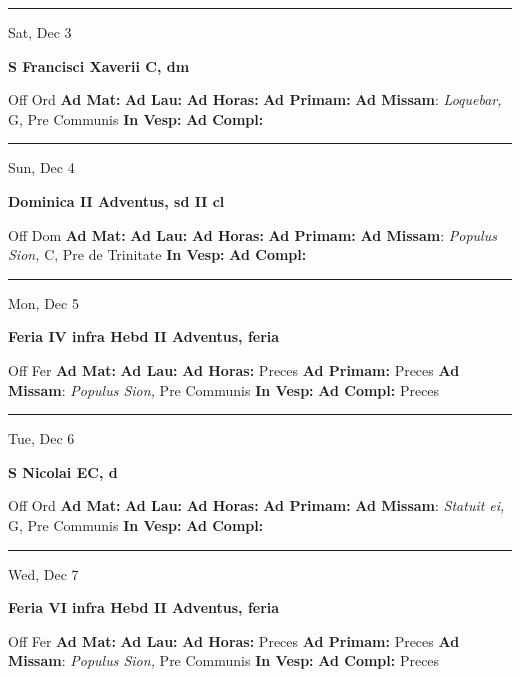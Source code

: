 \documentclass[letterpaper, 10pt]{article}
\begin{document}
\hrule
\begin{center}
Sat, Dec 3
\end{center}\textbf{ \large S Francisci Xaverii C, \textnormal{\normalsize dm}}
\begin{justify}
Off Ord
\textbf{Ad Mat: }
\textbf{Ad Lau: }
\textbf{Ad Horas: }
\textbf{Ad Primam: }
\textbf{Ad Missam}: \textit{Loquebar,} G, Pre Communis
\textbf{In Vesp: }
\textbf{Ad Compl: }\end{justify}



\hrule
\begin{center}
Sun, Dec 4
\end{center}\textbf{ \large Dominica II Adventus, \textnormal{\normalsize sd II cl}}
\begin{justify}
Off Dom
\textbf{Ad Mat: }
\textbf{Ad Lau: }
\textbf{Ad Horas: }
\textbf{Ad Primam: }
\textbf{Ad Missam}: \textit{Populus Sion,} C, Pre de Trinitate
\textbf{In Vesp: }
\textbf{Ad Compl: }\end{justify}



\hrule
\begin{center}
Mon, Dec 5
\end{center}\textbf{ \large Feria IV infra Hebd II Adventus, \textnormal{\normalsize feria}}
\begin{justify}
Off Fer
\textbf{Ad Mat: }
\textbf{Ad Lau: }
\textbf{Ad Horas: }Preces
\textbf{Ad Primam: }Preces
\textbf{Ad Missam}: \textit{Populus Sion,} Pre Communis
\textbf{In Vesp: }
\textbf{Ad Compl: }Preces\end{justify}



\hrule
\begin{center}
Tue, Dec 6
\end{center}\textbf{ \large S Nicolai EC, \textnormal{\normalsize d}}
\begin{justify}
Off Ord
\textbf{Ad Mat: }
\textbf{Ad Lau: }
\textbf{Ad Horas: }
\textbf{Ad Primam: }
\textbf{Ad Missam}: \textit{Statuit ei,} G, Pre Communis
\textbf{In Vesp: }
\textbf{Ad Compl: }\end{justify}



\hrule
\begin{center}
Wed, Dec 7
\end{center}\textbf{ \large Feria VI infra Hebd II Adventus, \textnormal{\normalsize feria}}
\begin{justify}
Off Fer
\textbf{Ad Mat: }
\textbf{Ad Lau: }
\textbf{Ad Horas: }Preces
\textbf{Ad Primam: }Preces
\textbf{Ad Missam}: \textit{Populus Sion,} Pre Communis
\textbf{In Vesp: }
\textbf{Ad Compl: }Preces\end{justify}
\end{document}
